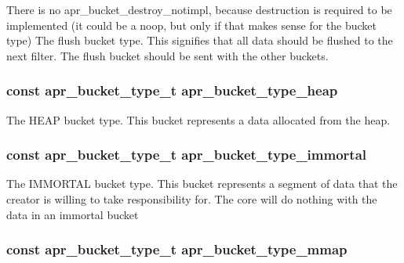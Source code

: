 There is no apr\-\_\-bucket\-\_\-destroy\-\_\-notimpl, because destruction is required to be implemented (it could be a noop, but only if that makes sense for the bucket type) The flush bucket type. This signifies that all data should be flushed to the next filter. The flush bucket should be sent with the other buckets. \hypertarget{group___a_p_r___util___bucket___brigades_ga2c5608267ed7b860657f5a1c89c2f40d}{
\subsubsection[{apr\-\_\-bucket\-\_\-type\-\_\-heap}]{\setlength{\rightskip}{0pt plus 5cm}const {\bf apr\-\_\-bucket\-\_\-type\-\_\-t} apr\-\_\-bucket\-\_\-type\-\_\-heap}}\label{group___a_p_r___util___bucket___brigades_ga2c5608267ed7b860657f5a1c89c2f40d}
The H\-E\-A\-P bucket type. This bucket represents a data allocated from the heap. \hypertarget{group___a_p_r___util___bucket___brigades_ga391ac24b2c85969e8efa504588b364bb}{
\subsubsection[{apr\-\_\-bucket\-\_\-type\-\_\-immortal}]{\setlength{\rightskip}{0pt plus 5cm}const {\bf apr\-\_\-bucket\-\_\-type\-\_\-t} apr\-\_\-bucket\-\_\-type\-\_\-immortal}}\label{group___a_p_r___util___bucket___brigades_ga391ac24b2c85969e8efa504588b364bb}
The I\-M\-M\-O\-R\-T\-A\-L bucket type. This bucket represents a segment of data that the creator is willing to take responsibility for. The core will do nothing with the data in an immortal bucket \hypertarget{group___a_p_r___util___bucket___brigades_ga63f9ce8e4d6e796921aad14a218a3b23}{
\subsubsection[{apr\-\_\-bucket\-\_\-type\-\_\-mmap}]{\setlength{\rightskip}{0pt plus 5cm}const {\bf apr\-\_\-bucket\-\_\-type\-\_\-t} apr\-\_\-bucket\-\_\-type\-\_\-mmap}}\label{group___a_p_r___util___bucket___brigades_ga63f9ce8e4d6e796921aad14a218a3b23}
